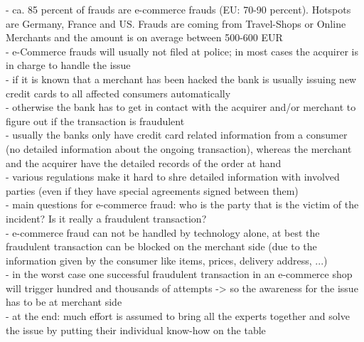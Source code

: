 - ca. 85 percent of frauds are e-commerce frauds (EU: 70-90 percent). Hotspots are Germany, France and US. Frauds are coming from Travel-Shops or Online Merchants and the amount is on average between 500-600 EUR \\
- e-Commerce frauds will usually not filed at police; in most cases the acquirer is in charge to handle the issue \\
- if it is known that a merchant has been hacked the bank is usually issuing new credit cards to all affected consumers automatically \\
- otherwise the bank has to get in contact with the acquirer and/or merchant to figure out if the transaction is fraudulent \\
- usually the banks only have credit card related information from a consumer (no detailed information about the ongoing transaction), whereas the merchant and the acquirer have the detailed records of the order at hand \\
- various regulations make it hard to shre detailed information with involved parties (even if they have special agreements signed between them) \\
- main questions for e-commerce fraud: who is the party that is the victim of the incident? Is it really a fraudulent transaction? \\
- e-commerce fraud can not be handled by technology alone, at best the fraudulent transaction can be blocked on the merchant side (due to the information given by the consumer like items, prices, delivery address, ...) \\
- in the worst case one successful fraudulent transaction in an e-commerce shop will trigger hundred and thousands of attempts -> so the awareness for the issue has to be at merchant side \\
- at the end: much effort is assumed to bring all the experts together and solve the issue by putting their individual know-how on the table \\


